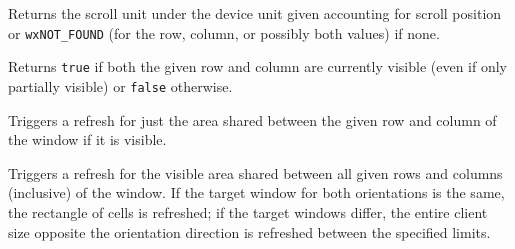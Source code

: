 \label{wxvarhvscrollhelperhittest}



Returns the scroll unit under the device unit given accounting for scroll
position or {\tt wxNOT\_FOUND} (for the row, column, or possibly both values)
if none.


\label{wxvarhvscrollhelperisvisible}



Returns {\tt true} if both the given row and column are currently visible
(even if only partially visible) or {\tt false} otherwise.


\label{wxvarhvscrollhelperrefreshrowcolumn}



Triggers a refresh for just the area shared between the given row and column
of the window if it is visible.


\label{wxvarhvscrollhelperrefreshrowscolumns}



Triggers a refresh for the visible area shared between all given rows and
columns (inclusive) of the window. If the target window for both orientations
is the same, the rectangle of cells is refreshed; if the target windows
differ, the entire client size opposite the orientation direction is
refreshed between the specified limits.


\label{wxvarhvscrollhelperscrolltorowcolumn}

